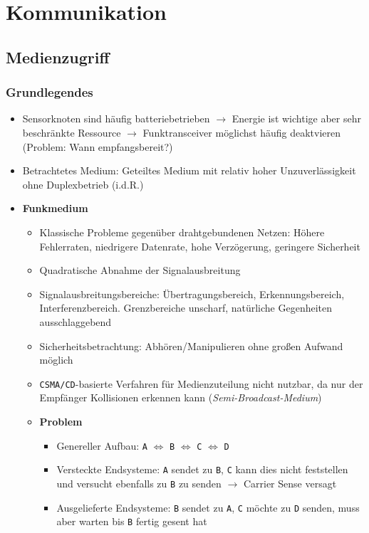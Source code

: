 


\section{Kommunikation}

\subsection{Medienzugriff}

\subsubsection{Grundlegendes}
\begin{itemize}
	\item Sensorknoten sind häufig batteriebetrieben \(\rightarrow\) Energie ist wichtige aber sehr beschränkte Ressource \(\rightarrow\) Funktransceiver möglichst häufig deaktvieren (Problem: Wann empfangsbereit?)
	\item Betrachtetes Medium: Geteiltes Medium mit relativ hoher Unzuverlässigkeit ohne Duplexbetrieb (i.d.R.)
	\item \textbf{Funkmedium}
	\begin{itemize}
		\item Klassische Probleme gegenüber drahtgebundenen Netzen: Höhere Fehlerraten, niedrigere Datenrate, hohe Verzögerung, geringere Sicherheit
		\item Quadratische Abnahme der Signalausbreitung
		\item Signalausbreitungsbereiche: Übertragungsbereich, Erkennungsbereich, Interferenzbereich. Grenzbereiche unscharf, natürliche Gegenheiten ausschlaggebend
		\item Sicherheitsbetrachtung: Abhören/Manipulieren ohne großen Aufwand möglich
		\item \texttt{CSMA/CD}-basierte Verfahren für Medienzuteilung nicht nutzbar, da nur der Empfänger Kollisionen erkennen kann (\textit{Semi-Broadcast-Medium})
		\item \textbf{Problem}
		\begin{itemize}
			\item Genereller Aufbau: \texttt{A} \(\Leftrightarrow\) \texttt{B} \(\Leftrightarrow\) \texttt{C} \(\Leftrightarrow\) \texttt{D}
			\item Versteckte Endsysteme: \texttt{A} sendet zu \texttt{B}, \texttt{C} kann dies nicht feststellen und versucht ebenfalls zu \texttt{B} zu senden \(\rightarrow\) Carrier Sense versagt
			\item Ausgelieferte Endsysteme: \texttt{B} sendet zu \texttt{A}, \texttt{C} möchte zu \texttt{D} senden, muss aber warten bis \texttt{B} fertig gesent hat

\end{itemize}
\end{itemize}
\end{itemize}
